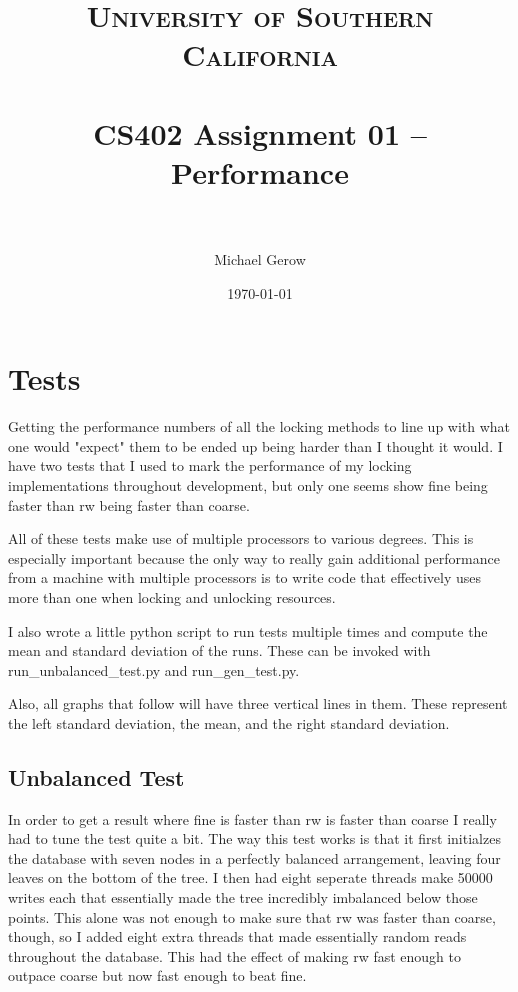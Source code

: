 \documentclass[paper=a4, fontsize=11pt]{scrartcl} %
\title{	
\normalfont \normalsize 
\textsc{University of Southern California} \\ [25pt] %
\horrule{0.5pt} \\[0.4cm] %
\huge CS402 Assignment 01 -- Performance \\ %
\horrule{2pt} \\[0.5cm] %
}
\author{Michael Gerow} %
\date{\normalsize\today} %
\numberwithin{equation}{section} %
\numberwithin{figure}{section} %
\numberwithin{table}{section} %
\begin{document}
\maketitle %


\section{Tests}
Getting the performance numbers of all the locking methods to line up with what one would "expect" them to be ended up being harder than I thought it would. I have two tests that I used to mark the performance of my locking implementations throughout development, but only one seems show fine being faster than rw being faster than coarse.

All of these tests make use of multiple processors to various degrees.  This is especially important because the only way to really gain additional performance from a machine with multiple processors is to write code that effectively uses more than one when locking and unlocking resources.

I also wrote a little python script to run tests multiple times and compute the mean and standard deviation of the runs.  These can be invoked with run\_unbalanced\_test.py and run\_gen\_test.py.

Also, all graphs that follow will have three vertical lines in them.  These represent the left standard deviation, the mean, and the right standard deviation.

\subsection{Unbalanced Test}
In order to get a result where fine is faster than rw is faster than coarse I really had to tune the test quite a bit. The way this test works is that it first initialzes the database with seven nodes in a perfectly balanced arrangement, leaving four leaves on the bottom of the tree.  I then had eight seperate threads make 50000 writes each that essentially made the tree incredibly imbalanced below those points. This alone was not enough to make sure that rw was faster than coarse, though, so I added eight extra threads that made essentially random reads throughout the database.  This had the effect of making rw fast enough to outpace coarse but now fast enough to beat fine.
\end{document}
